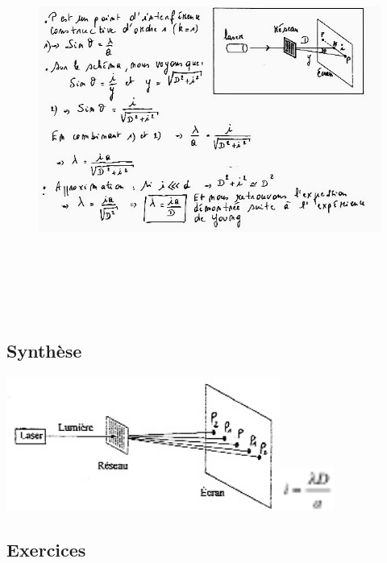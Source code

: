 \begin{figure}
\centering
\includegraphics[width=19.177cm,height=12.658cm]{Pictures/10000001000002580000018C86EAAA8910282BD9.png}
\caption{}
\end{figure}

\subsection{Synthèse}

\includegraphics[width=8.976cm,height=4.397cm]{Pictures/100000010000010800000081DE709BA3D328A388.png}\includegraphics[width=1.757cm,height=1.432cm]{Pictures/100000010000001A0000001535F2FEA5DABE5CC8.png}

\subsection{Exercices}

